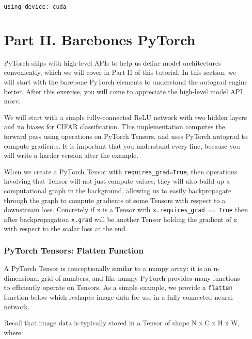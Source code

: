 \documentclass[11pt]{article}
\begin{document}
    \begin{Verbatim}[commandchars=\\\{\}]
using device: cuda

    \end{Verbatim}

    \section{Part II. Barebones PyTorch}\label{part-ii.-barebones-pytorch}

PyTorch ships with high-level APIs to help us define model architectures
conveniently, which we will cover in Part II of this tutorial. In this
section, we will start with the barebone PyTorch elements to understand
the autograd engine better. After this exercise, you will come to
appreciate the high-level model API more.

We will start with a simple fully-connected ReLU network with two hidden
layers and no biases for CIFAR classification. This implementation
computes the forward pass using operations on PyTorch Tensors, and uses
PyTorch autograd to compute gradients. It is important that you
understand every line, because you will write a harder version after the
example.

When we create a PyTorch Tensor with \texttt{requires\_grad=True}, then
operations involving that Tensor will not just compute values; they will
also build up a computational graph in the background, allowing us to
easily backpropagate through the graph to compute gradients of some
Tensors with respect to a downstream loss. Concretely if x is a Tensor
with \texttt{x.requires\_grad\ ==\ True} then after backpropagation
\texttt{x.grad} will be another Tensor holding the gradient of x with
respect to the scalar loss at the end.

    \subsubsection{PyTorch Tensors: Flatten
Function}\label{pytorch-tensors-flatten-function}

A PyTorch Tensor is conceptionally similar to a numpy array: it is an
n-dimensional grid of numbers, and like numpy PyTorch provides many
functions to efficiently operate on Tensors. As a simple example, we
provide a \texttt{flatten} function below which reshapes image data for
use in a fully-connected neural network.

Recall that image data is typically stored in a Tensor of shape N x C x
H x W, where:
\end{document}
